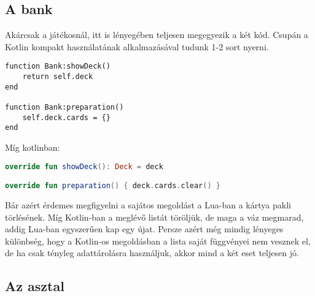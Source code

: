 \newpage

\subsection{A bank}

Akárcsak a játékosnál, itt is lényegében teljesen megegyezik a két kód. Csupán a Kotlin kompakt használatának alkalmazásával tudunk 1-2 sort nyerni.
\scriptsize
\begin{lstlisting}[style=Lua]
function Bank:showDeck()
	return self.deck
end

function Bank:preparation()
	self.deck.cards = {}
end
\end{lstlisting}
\normalsize
Míg kotlinban:
\scriptsize
\begin{lstlisting}[language = Kotlin]
override fun showDeck(): Deck = deck

override fun preparation() { deck.cards.clear() }
\end{lstlisting}
\normalsize
Bár azért érdemes megfigyelni a sajátos megoldást a Lua-ban a kártya pakli törlésének. Míg Kotlin-ban a meglévő listát töröljük, de maga a váz megmarad, addig  Lua-ban egyszerűen kap egy újat. Persze azért még mindig lényeges különbség, hogy a Kotlin-os megoldásban a lista saját függvényei nem vesznek el, de ha csak tényleg adattárolásra használjuk, akkor mind a két eset teljesen jó.

\subsection{Az asztal}

